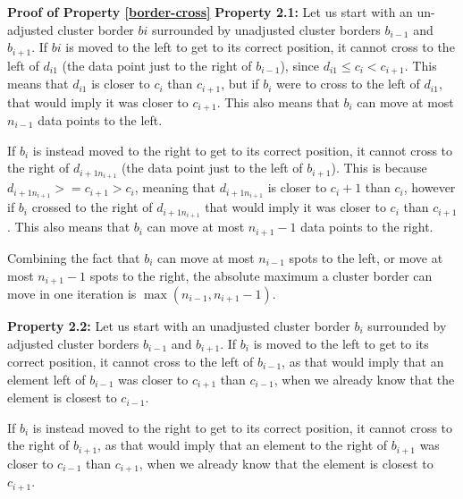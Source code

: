 \documentclass[conference,compsoc]{IEEEtran}
\newtheorem{subprp}{Property}[proofprp]
\begin{document}



\textbf{Proof of Property \ref{border-cross}}
\textbf{Property 2.1:}
Let us start with an un-adjusted cluster border $bi$ surrounded by unadjusted cluster borders $b_{i-1}$ and $b_{i+1}$.
If $bi$ is moved to the left to get to its correct position, it cannot cross to the left of $d_{i1}$ (the data point just to the right of $b_{i-1}$), since $d_{i1} \leq c_i < c_{i+1}$.
This means that $d_{i1}$ is closer to $c_i$ than $c_{i+1}$, but if $b_i$ were to cross to the left of $d_{i1}$, that would imply it was closer to $c_{i+1}$.
This also means that $b_i$ can move at most $n_{i-1}$ data points to the left.

If $b_i$ is instead moved to the right to get to its correct position, it cannot cross to the right of $d_{i+1n_{i+1}}$ (the data point just to the left of $b_{i+1}$).
This is because $d_{i+1n_{i+1}} >= c_{i+1} > c_i$, meaning that $d_{i+1n_{i+1}}$ is closer to $c_i+1$ than $c_i$,
however if $b_i$ crossed to the right of $d_{i+1n_{i+1}}$ that would imply it was closer to $c_i$ than $c_{i+1}$.
This also means that $b_i$ can move at most $n_{i+1}-1$ data points to the right.

Combining the fact that $b_i$ can move at most $n_{i-1}$ spots to the left, or move at most $n_{i+1}-1$ spots to the right, the absolute maximum a cluster border can move in one iteration is $\max(n_{i-1}, n_{i+1}-1)$.

\textbf{Property 2.2:}
Let us start with an unadjusted cluster border $b_i$ surrounded by adjusted cluster borders $b_{i-1}$ and $b_{i+1}$.
If $b_i$ is moved to the left to get to its correct position, it cannot cross to the left of $b_{i-1}$,
as that would imply that an element left of $b_{i-1}$ was closer to $c_{i+1}$ than $c_{i-1}$, when we already know that the element is closest to $c_{i-1}$.

If $b_i$ is instead moved to the right to get to its correct position, it cannot cross to the right of $b_{i+1}$,
as that would imply that an element to the right of $b_{i+1}$ was closer to $c_{i-1}$ than $c_{i+1}$, when we already know that the element is closest to $c_{i+1}$.
\end{document}
